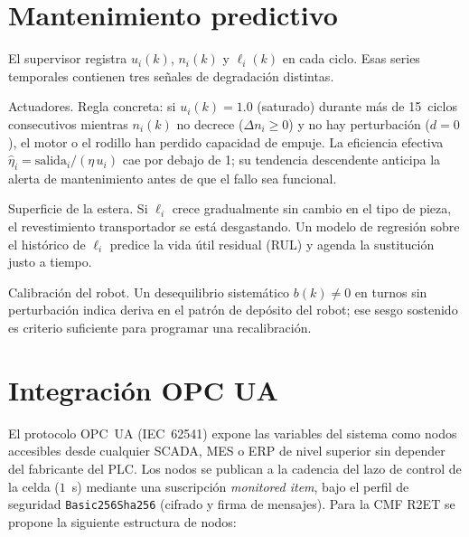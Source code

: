 \section{Mantenimiento predictivo}

El supervisor registra $u_i(k)$, $n_i(k)$ y $\ell_i(k)$ en cada ciclo. Esas series temporales contienen tres señales de degradación distintas.

Actuadores. Regla concreta: si $u_i(k)=1.0$ (saturado) durante más de 15~ciclos consecutivos mientras $n_i(k)$ no decrece ($\Delta n_i \geq 0$) y no hay perturbación ($d=0$), el motor o el rodillo han perdido capacidad de empuje. La eficiencia efectiva $\hat{\eta}_i = \text{salida}_i/(\eta\,u_i)$ cae por debajo de 1; su tendencia descendente anticipa la alerta de mantenimiento antes de que el fallo sea funcional.

Superficie de la estera. Si $\ell_i$ crece gradualmente sin cambio en el tipo de pieza, el revestimiento transportador se está desgastando. Un modelo de regresión sobre el histórico de $\ell_i$ predice la vida útil residual (RUL) y agenda la sustitución justo a tiempo.

Calibración del robot. Un desequilibrio sistemático $b(k) \neq 0$ en turnos sin perturbación indica deriva en el patrón de depósito del robot; ese sesgo sostenido es criterio suficiente para programar una recalibración.

\section{Integración OPC UA}

El protocolo OPC~UA (IEC~62541) expone las variables del sistema como nodos accesibles desde cualquier SCADA, MES o ERP de nivel superior sin depender del fabricante del PLC. Los nodos se publican a la cadencia del lazo de control de la celda ($1$~s) mediante una suscripción \emph{monitored item}, bajo el perfil de seguridad \texttt{Basic256Sha256} (cifrado y firma de mensajes). Para la CMF R2ET se propone la siguiente estructura de nodos:

